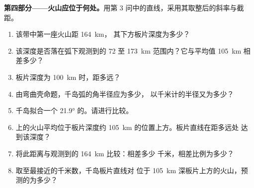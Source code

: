 \begin{problem}
\medskip
\noindent\textbf{第四部分——火山应位于何处。}用第
3 问中的直线，采用其取整后的斜率与截距。
\begin{enumerate}[resume]
  \item 该带中第一座火山距 \qty{164}{km}，
        其下方板片深度为多少？
  \item 该深度是否落在弧下观测到的
        72 至 \qty{173}{km} 范围内？它与平均值 \qty{105}{km} 相差多少？
  \item 板片深度为 \qty{100}{km} 时，距多远？
  \item 由弯曲壳命题，千岛弧的角半径应为多少，
        以千米计的半径又为多少？
  \item 千岛拟合一个 \ang{21.9} 的。请进行比较。
  \item {}上的火山平均位于板片深度约
        \qty{105}{km} 的位置上方。板片直线在距多远处
        达到该深度？
  \item 将此距离与观测到的 \qty{164}{km} 比较：相差多少
        千米，相差比例为多少？
  \item 取至最接近的千米数，千岛板片直线对
        位于 \qty{105}{km} 深板片上方的火山，预测的为多少？
\end{enumerate}
\end{problem}
